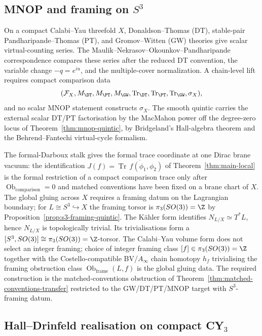 \subsection{MNOP and framing on
  \texorpdfstring{$S^3$}{S3}}\label{ssec:comparison-mnop-framing}

On a compact Calabi--Yau threefold \(X\), Donaldson--Thomas (DT),
stable-pair Pandharipande--Thomas (PT), and Gromov--Witten (GW)
theories give scalar virtual-counting series.  The
Maulik--Nekrasov--Okounkov--Pandharipande correspondence compares these
series after the reduced DT convention, the variable change
\(-q=e^{iu}\), and the multiple-cover normalization.  A chain-level
lift requires compact comparison data
\[
  (\mathcal F_X,M_{\DT},M_{\PT},M_{\GW},
  \operatorname{Tr}_{\DT},\operatorname{Tr}_{\PT},
  \operatorname{Tr}_{\GW},\sigma_X),
\]
and no scalar MNOP statement constructs \(\sigma_X\).  The smooth
quintic carries the external scalar DT/PT factorisation by the MacMahon
power off the degree-zero locus of Theorem~\ref{thm:mnop-quintic}, by
Bridgeland's Hall-algebra theorem and the Behrend--Fantechi
virtual-cycle formalism.

The formal-Darboux stalk gives the formal trace coordinate at one Dirac
brane vacuum: the identification
$J(f)=\overline{\operatorname{Tr}\,f(\phi_1,\phi_2)}$ of
Theorem~\ref{thm:main-local} is the formal restriction of a compact
comparison trace only after
\(\operatorname{Ob}_{\mathrm{comparison}}=0\) and matched conventions have
been fixed on a brane chart of \(X\).  The global gluing
across $X$ requires a framing datum on the Lagrangian boundary;
for $L\cong S^3\hookrightarrow X$ the framing torsor is
$\pi_3(SO(3))=\Z$ by Proposition~\ref{prop:s3-framing-quintic}.  The
K\"ahler form identifies \(N_{L/X}\simeq T^*L\), hence
\(N_{L/X}\) is topologically trivial.  Its trivialisations form a
\([S^3,SO(3)]\cong\pi_3(SO(3))=\Z\)-torsor.  The Calabi--Yau volume
form does not select an integer framing; choice of integer framing class
$[f]\in\pi_3(SO(3))=\Z$ together with the Costello-compatible
BV/$A_\infty$ chain homotopy $h_f$ trivialising the framing
obstruction class $\operatorname{Ob}_{\mathrm{frame}}(L,f)$ is the
global gluing data.  The required construction is the
matched-conventions obstruction of
Theorem~\ref{thm:matched-conventions-transfer} restricted to the
GW/DT/PT/MNOP target with $S^3$-framing datum.

\subsection{\texorpdfstring{Hall--Drinfeld realisation on compact CY$_3$}{Hall-Drinfeld realisation on compact CY3}}\label{ssec:comparison-hall-drinfeld}

